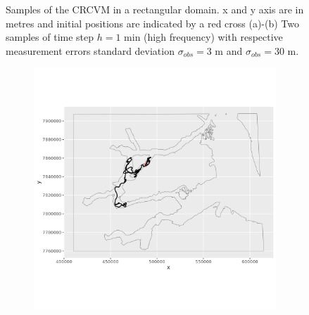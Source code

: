 \documentclass[11pt]{article}
\newcommand {\1}{\mathbb{1}}
\begin{document}
\begin{figure}[H]
\begin{subfigure}{0.48\textwidth}
 		\caption{}
 	\end{subfigure}
 	\caption{Samples of the CRCVM in a rectangular domain. x and y axis are in metres and initial positions are indicated by a red cross (a)-(b) Two samples of time step $h=1$ min (high frequency) with respective measurement errors standard deviation $\sigma_{obs}=3$ m and $\sigma_{obs}=30$ m.}
 	\label{fig: samples_rect_CRCVM}
 \end{figure}
 
 
 \begin{figure}[H]
 	\centering
 	\begin{subfigure}{0.48\textwidth}
 		\centering
 		\includegraphics[scale=0.5]{images/simulation study/samples_fjords_hf_ne_omega.png}
 		\caption{}
 	\end{subfigure}
 	\begin{subfigure}{0.48\textwidth}
 		\centering

\end{subfigure}
\end{figure}
\end{document}
